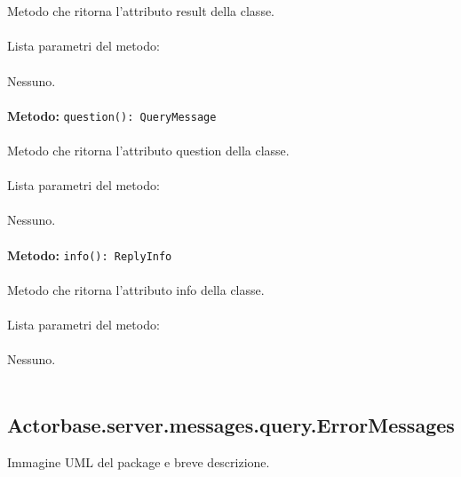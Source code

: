 \documentclass[a4paper]{article}
\begin{document}
			\\ \\
			Metodo che ritorna l'attributo result della classe.
			\\ \\
			Lista parametri del metodo:
			\\ \\
			Nessuno.
			\\ \\		
			\textbf{Metodo: } \texttt{question(): QueryMessage}
			\\ \\
			Metodo che ritorna l'attributo question della classe.
			\\ \\
			Lista parametri del metodo:
			\\ \\
			Nessuno.
			\\ \\
			\textbf{Metodo: } \texttt{info(): ReplyInfo}
			\\ \\	
			Metodo che ritorna l'attributo info della classe.
			\\ \\
			Lista parametri del metodo:
			\\ \\
			Nessuno.
			\\ \\
			
	\subsection{Actorbase.server.messages.query.ErrorMessages}
		Immagine UML del package e breve descrizione.
		
\end{document}
